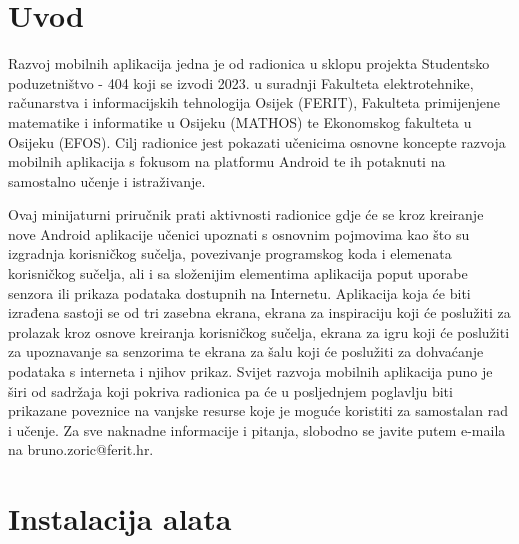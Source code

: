 \documentclass[11pt,a4paper,twoside]{article}
\begin{document}
	
\section{Uvod}

	Razvoj mobilnih aplikacija jedna je od radionica u sklopu projekta Studentsko poduzetništvo - 404 koji se izvodi 2023. u suradnji Fakulteta elektrotehnike, računarstva i informacijskih tehnologija Osijek (FERIT), Fakulteta primijenjene matematike i informatike u Osijeku (MATHOS) te Ekonomskog fakulteta u Osijeku (EFOS). Cilj radionice jest pokazati učenicima osnovne koncepte razvoja mobilnih aplikacija s fokusom na platformu Android te ih potaknuti na samostalno učenje i istraživanje.
	
	Ovaj minijaturni priručnik prati aktivnosti radionice gdje će se kroz kreiranje nove Android aplikacije učenici upoznati s osnovnim pojmovima kao što su izgradnja korisničkog sučelja, povezivanje programskog koda i elemenata korisničkog sučelja, ali i sa složenijim elementima aplikacija poput uporabe senzora ili prikaza podataka dostupnih na Internetu. Aplikacija koja će biti izrađena sastoji se od tri zasebna ekrana, ekrana za inspiraciju koji će poslužiti za prolazak kroz osnove kreiranja korisničkog sučelja, ekrana za igru koji će poslužiti za upoznavanje sa senzorima te ekrana za šalu koji će poslužiti za dohvaćanje podataka s interneta i njihov prikaz. Svijet razvoja mobilnih aplikacija puno je širi od sadržaja koji pokriva radionica pa će u posljednjem poglavlju biti prikazane poveznice na vanjske resurse koje je moguće koristiti za samostalan rad i učenje. Za sve naknadne informacije i pitanja, slobodno se javite putem e-maila na bruno.zoric@ferit.hr.
	
	\begin{infoBox}		
		
	\end{infoBox}
	
\section{Instalacija alata}
\end{document}
